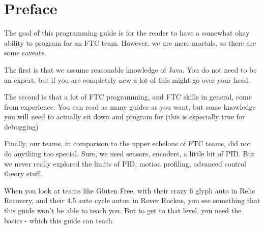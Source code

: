 \documentclass[../main.tex]{subfiles}
\begin{document}
\newpage
\part{Preface}

The goal of this programming guide is for the reader to have a somewhat okay ability to program for an FTC team. However, we are mere mortals, so there are some caveats. 
\par The first is that we assume reasonable knowledge of Java. You do not need to be an expert, but if you are completely new a lot of this might go over your head.

\par The second is that a lot of FTC programming, and FTC skills in general, come from experience. You can read as many guides as you want, but some knowledge you will need to actually sit down and program for (this is especially true for debugging)

\par Finally, our teams, in comparison to the upper echelons of FTC teams, did not do anything too special. Sure, we used sensors, encoders, a little bit of PID. But we never really explored the limits of PID, motion profiling, advanced control theory stuff. 

When you look at teams like Gluten Free, with their crazy 6 glyph auto in Relic Recovery, and their 4.5 auto cycle auton in Rover Ruckus, you see something that this guide won't be able to teach you. But to get to that level, you need the basics - which this guide can teach.
\end{document}
